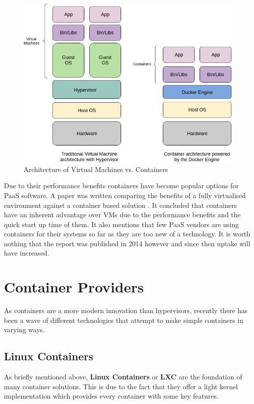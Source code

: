 \begin{figure}[h!]
    \centering
    \includegraphics[scale=0.4]{res/Virtualisation.png}
    \caption{Architecture of Virtual Machines vs. Containers}
    \label{fig:architecture}
\end{figure}

Due to their performance benefits containers have become popular options for PaaS software. A paper was written comparing the benefits of a fully virtualised environment against a container based solution \cite{contsvsvirt}. It concluded that containers have an inherent advantage over VMs due to the performance benefits and the quick start up time of them. It also mentions that few PaaS vendors are using containers for their systems so far as they are too new of a technology. It is worth nothing that the report was published in 2014 however and since then uptake will have increased.

\section{Container Providers}

As containers are a more modern innovation than hypervisors, recently there has been a wave of different technologies that attempt to make simple containers in varying ways.

\subsection{Linux Containers}

As briefly mentioned above, \textbf{Linux Containers} or \textbf{LXC} are the foundation of many container solutions. This is due to the fact that they offer a light kernel implementation which provides every container with some key features.

